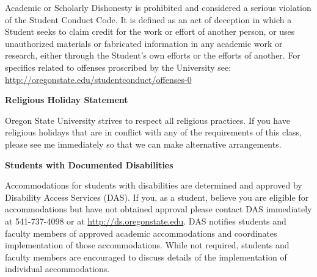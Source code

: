 \documentclass[11pt]{article}
\begin{document}
Academic or Scholarly Dishonesty is prohibited and considered a serious violation of the Student Conduct Code. It is defined as an act of deception in which a Student seeks to claim credit for the work or effort of another person, or uses unauthorized materials or fabricated information in any academic work or research, either through the Student's own efforts or the efforts of another. For specifics related to offenses proscribed by the University see: \url{http://oregonstate.edu/studentconduct/offenses-0}


\vspace{8pt}

\noindent\textbf{Religious Holiday Statement}

Oregon State University strives to respect all religious practices. If you have religious holidays that are in conflict with any of the requirements of this class, please see me immediately so that we can make alternative arrangements.

\vspace{8pt}

\noindent\textbf{Students with Documented Disabilities}

Accommodations for students with disabilities are determined and approved by Disability Access Services (DAS). If you, as a student, believe you are eligible for accommodations but have not obtained approval please contact DAS immediately at 541-737-4098 or at \url{http://ds.oregonstate.edu}. DAS notifies students and faculty members of approved academic accommodations and coordinates implementation of those accommodations. While not required, students and faculty members are encouraged to discuss details of the implementation of individual accommodations.
\end{document}
